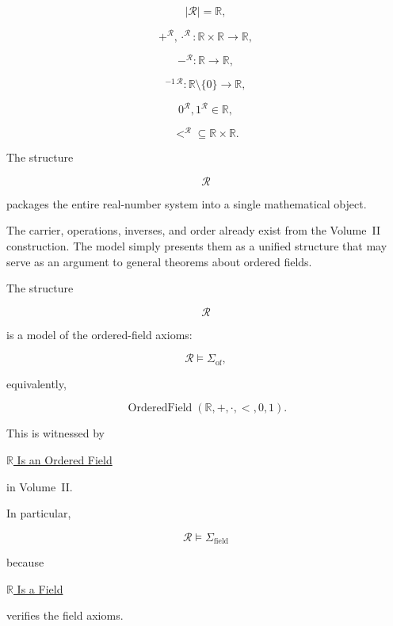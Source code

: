 
\begin{remark*}

\[
|\mathcal R|
=
\mathbb R,
\]

\[
+^{\mathcal R},
\cdot^{\mathcal R}
:
\mathbb R\times\mathbb R
\to
\mathbb R,
\]

\[
-^{\mathcal R}
:
\mathbb R
\to
\mathbb R,
\]

\[
{}^{-1\,\mathcal R}
:
\mathbb R\setminus\{0\}
\to
\mathbb R,
\]

\[
0^{\mathcal R},
1^{\mathcal R}
\in
\mathbb R,
\]

\[
<^{\mathcal R}
\subseteq
\mathbb R\times\mathbb R.
\]

\end{remark*}


\begin{remark*}[Interpretation]

The structure

\[
\mathcal R
\]

packages the entire real-number system into a single mathematical object.

The carrier, operations, inverses, and order already exist from the Volume~II
construction. The model simply presents them as a unified structure that may
serve as an argument to general theorems about ordered fields.

\end{remark*}


\begin{remark*}[Satisfaction]

The structure

\[
\mathcal R
\]

is a model of the ordered-field axioms:

\[
\mathcal R
\models
\Sigma_{\mathrm{of}},
\]

equivalently,

\[
\operatorname{OrderedField}
(\mathbb R,+,\cdot,<,0,1).
\]

This is witnessed by

\hyperref[thm:r-is-ordered-field]{$\mathbb R$ Is an Ordered Field}

in Volume~II.

In particular,

\[
\mathcal R
\models
\Sigma_{\mathrm{field}}
\]

because

\hyperref[thm:r-is-field]{$\mathbb R$ Is a Field}

verifies the field axioms.

\end{remark*}


